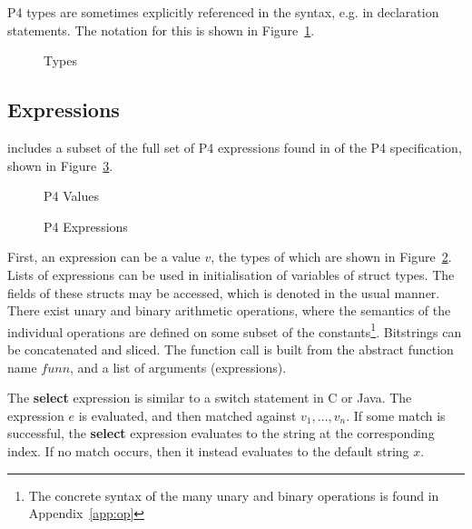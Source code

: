 \documentclass[UTF8]{article}
\begin{document}
P4 types are sometimes explicitly referenced in the syntax, e.g. in declaration statements. The notation for this is shown in Figure~\ref{fig:types}.

\begin{figure}[h!]
\centering\ottgrammartabular{
\otttau\ottafterlastrule
}
\caption{Types}
\label{fig:types}
\end{figure}

\newcommand{\funn}{\ensuremath{\mathit{funn}}}
\subsection{Expressions}
\newcommand{\fmap}{\textit{F}}

\pfott{} includes a subset of the full set of P4 expressions found in {} of the P4 specification, shown in Figure~\ref{fig:exp}.

\begin{figure}[h!]
\centering\ottgrammartabular{
\ottv\ottafterlastrule
}
\caption{P4 Values}
\label{fig:val}
\end{figure}

\begin{figure}[h!]
\centering\ottgrammartabular{
\otte\ottafterlastrule
}
\caption{P4 Expressions}
\label{fig:exp}
\end{figure}
\newcommand{\stmt}{\textit{stmt}}
\newcommand{\cval}{\ensuremath{v}}
\newcommand{\fexec}[1]{\textbf{exec}\,\,#1}

First, an expression can be a value $v$, the types of which are shown in Figure~\ref{fig:val}. Lists of expressions can be used in initialisation of variables of struct types. The fields of these structs may be accessed, which is denoted in the usual manner. There exist unary and binary arithmetic operations, where the semantics of the individual operations are defined on some subset of the constants\footnote{The concrete syntax of the many unary and binary operations is found in Appendix~\ref{app:op}}. Bitstrings can be concatenated and sliced. The function call is built from the abstract function name \funn{}, and a list of arguments (expressions).

The \textbf{select} expression is similar to a switch statement in C or Java. The expression $e$ is evaluated, and then matched against $v_1 , \ldots , v_n$. If some match is successful, the \textbf{select} expression evaluates to the string at the corresponding index. If no match occurs, then it instead evaluates to the default string $x$.
\end{document}

